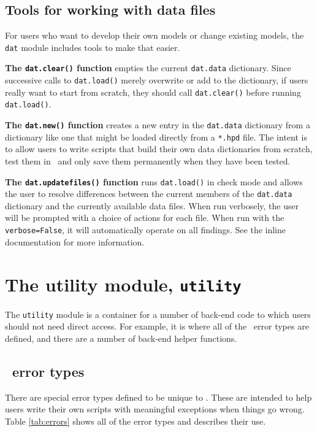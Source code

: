\subsection{Tools for working with data files}\label{sec:regdat:tools}

For users who want to develop their own models or change existing models, the \texttt{dat} module includes tools to make that easier.  

{\bf The \texttt{dat.clear()} function} empties the current \texttt{dat.data} dictionary.  Since successive calls to \texttt{dat.load()} merely overwrite or add to the dictionary, if users really want to start from scratch, they should call \texttt{dat.clear()} before running \texttt{dat.load()}.

{\bf The \texttt{dat.new()} function} creates a new entry in the \texttt{dat.data} dictionary from a dictionary like one that might be loaded directly from a \texttt{*.hpd} file.  The intent is to allow users to write scripts that build their own data dictionaries from scratch, test them in \PM\ and only save them permanently when they have been tested.

{\bf The \texttt{dat.updatefiles()} function} runs \texttt{dat.load()} in check mode and allows the user to resolve differences between the current members of the \texttt{dat.data} dictionary and the currently available data files.  When run verbosely, the user will be prompted with a choice of actions for each file.  When run with the \texttt{verbose=False}, it will automatically operate on all findings.  See the inline documentation for more information.

\section{The utility module, \texttt{utility}}

The \texttt{utility} module is a container for a number of back-end code to which users should not need direct access.  For example, it is where all of the \PM\ error types are defined, and there are a number of back-end helper functions.

\subsection{\PM\ error types}

There are special error types defined to be unique to \PM.  These are intended to help users write their own scripts with meaningful exceptions when things go wrong.  Table \ref{tab:errors} shows all of the error types and describes their use.

